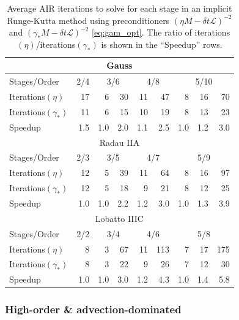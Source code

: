 \documentclass[review]{siamart}
\begin{document}
{
\renewcommand{\arraystretch}{1.15}
\begin{table}[!ht]
  \centering
  \begin{tabular}{|l || r | rr | rr | rrr |}  %
  \hline
\multicolumn{9}{|c|}{Gauss}\\\hline
Stages/Order & 2/4 & \multicolumn{2}{c}{3/6} & \multicolumn{2}{|c}{4/8} & \multicolumn{3}{|c|}{5/10} \\\hline
Iterations$(\eta)$ & 17 & 6 & 30 & 11  & 47 & 8 & 16 & 70 \\
Iterations$(\gamma_*)$ & 11 & 6 & 15 & 10 & 19 & 8 & 13 & 23 \\\hline
Speedup & 1.5 & 1.0 & 2.0 & 1.1 & 2.5 & 1.0 & 1.2 & 3.0 \\\hline\hline
\multicolumn{9}{|c|}{Radau IIA}\\\hline
Stages/Order & 2/3 & \multicolumn{2}{c}{3/5} & \multicolumn{2}{|c}{4/7} & \multicolumn{3}{|c|}{5/9} \\\hline
Iterations$(\eta)$ & 12 & 5 & 39 & 11 & 64 & 8 & 16 & 97 \\
Iterations$(\gamma_*)$ & 12 & 5 & 18 & 9 & 21 & 8 & 12 & 25 \\\hline
Speedup & 1.0 & 1.0 & 2.2 & 1.2 & 3.0 & 1.0 & 1.3 & 3.9 \\\hline\hline
\multicolumn{9}{|c|}{Lobatto IIIC}\\\hline
Stages/Order & 2/2 & \multicolumn{2}{c}{3/4} & \multicolumn{2}{|c}{4/6} & \multicolumn{3}{|c|}{5/8} \\\hline
Iterations$(\eta)$ & 8 & 3 & 67 & 11 & 113 & 7 & 17 & 175 \\
Iterations$(\gamma_*)$ & 8 & 3 & 22 & 9 & 26 & 7 & 12 & 30 \\\hline
Speedup & 1.0 & 1.0 & 3.0 & 1.2 & 4.3 & 1.0 & 1.4 & 5.8 \\\hline\hline
  \end{tabular}
  \caption{Average AIR iterations to solve for each stage in an implicit
  Runge-Kutta method using preconditioners $(\eta M - \delta t \mathcal{L})^{-2}$ and
  $(\gamma_* M - \delta t \mathcal{L})^{-2}$ \eqref{eq:gam_opt}. The ratio of
  iterations$(\eta)$/iterations$(\gamma_*)$ is shown in the ``Speedup'' rows.}
  \label{tab:gamma}
\end{table}
}


\subsubsection{High-order \& advection-dominated}\label{sec:numerics:dg:adv}
\end{document}

